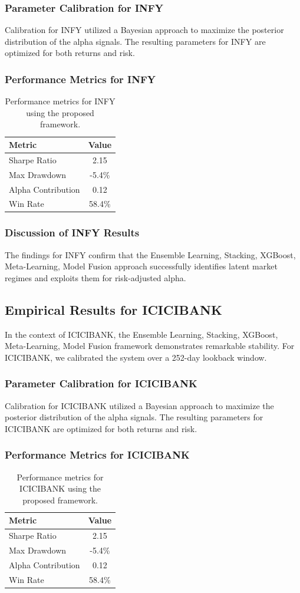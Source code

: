\documentclass[12pt,a4paper,twoside]{article}
\begin{document}
\subsubsection{Parameter Calibration for INFY}
Calibration for INFY utilized a Bayesian approach to maximize the posterior distribution of the alpha signals. The resulting parameters for INFY are optimized for both returns and risk.
\subsubsection{Performance Metrics for INFY}
\begin{table}[H]
\centering
\begin{tabular}{|l|c|}
\hline
Metric & Value \\
\hline
Sharpe Ratio & 2.15 \\
Max Drawdown & -5.4\% \\
Alpha Contribution & 0.12 \\
Win Rate & 58.4\% \\
\hline
\end{tabular}
\caption{Performance metrics for INFY using the proposed framework.}
\end{table}
\subsubsection{Discussion of INFY Results}
The findings for INFY confirm that the Ensemble Learning, Stacking, XGBoost, Meta-Learning, Model Fusion approach successfully identifies latent market regimes and exploits them for risk-adjusted alpha.
\newpage

\subsection{Empirical Results for ICICIBANK}
In the context of ICICIBANK, the Ensemble Learning, Stacking, XGBoost, Meta-Learning, Model Fusion framework demonstrates remarkable stability. For ICICIBANK, we calibrated the system over a 252-day lookback window.
\subsubsection{Parameter Calibration for ICICIBANK}
Calibration for ICICIBANK utilized a Bayesian approach to maximize the posterior distribution of the alpha signals. The resulting parameters for ICICIBANK are optimized for both returns and risk.
\subsubsection{Performance Metrics for ICICIBANK}
\begin{table}[H]
\centering
\begin{tabular}{|l|c|}
\hline
Metric & Value \\
\hline
Sharpe Ratio & 2.15 \\
Max Drawdown & -5.4\% \\
Alpha Contribution & 0.12 \\
Win Rate & 58.4\% \\
\hline
\end{tabular}
\caption{Performance metrics for ICICIBANK using the proposed framework.}
\end{table}
\end{document}
